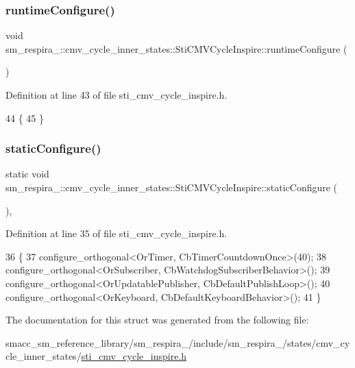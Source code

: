 \subsubsection{\texorpdfstring{runtime\+Configure()}{runtimeConfigure()}}
{\footnotesize\ttfamily void sm\+\_\+respira\+\_\+::cmv\+\_\+cycle\+\_\+inner\+\_\+states\+::\+Sti\+C\+M\+V\+Cycle\+Inspire\+::runtime\+Configure (\begin{DoxyParamCaption}{ }\end{DoxyParamCaption})\hspace{0.3cm}{\ttfamily [inline]}}



Definition at line 43 of file sti\+\_\+cmv\+\_\+cycle\+\_\+inspire.\+h.


\begin{DoxyCode}
44   \{
45   \}
\end{DoxyCode}
\mbox{\label{structsm__respira__1_1_1cmv__cycle__inner__states_1_1StiCMVCycleInspire_ad2d5e10f6e132b4184bda112e24aeecb}} 
\subsubsection{\texorpdfstring{static\+Configure()}{staticConfigure()}}
{\footnotesize\ttfamily static void sm\+\_\+respira\+\_\+::cmv\+\_\+cycle\+\_\+inner\+\_\+states\+::\+Sti\+C\+M\+V\+Cycle\+Inspire\+::static\+Configure (\begin{DoxyParamCaption}{ }\end{DoxyParamCaption})\hspace{0.3cm}{\ttfamily [inline]}, {\ttfamily [static]}}



Definition at line 35 of file sti\+\_\+cmv\+\_\+cycle\+\_\+inspire.\+h.


\begin{DoxyCode}
36   \{
37     configure\_orthogonal<OrTimer, CbTimerCountdownOnce>(40);
38     configure\_orthogonal<OrSubscriber, CbWatchdogSubscriberBehavior>();
39     configure\_orthogonal<OrUpdatablePublisher, CbDefaultPublishLoop>();
40     configure\_orthogonal<OrKeyboard, CbDefaultKeyboardBehavior>();
41   \}
\end{DoxyCode}


The documentation for this struct was generated from the following file\+:\begin{DoxyCompactItemize}
\item 
smacc\+\_\+sm\+\_\+reference\+\_\+library/sm\+\_\+respira\+\_/include/sm\+\_\+respira\+\_/states/cmv\+\_\+cycle\+\_\+inner\+\_\+states/\hyperlink{sti__cmv__cycle__inspire_8h}{sti\+\_\+cmv\+\_\+cycle\+\_\+inspire.\+h}\end{DoxyCompactItemize}
